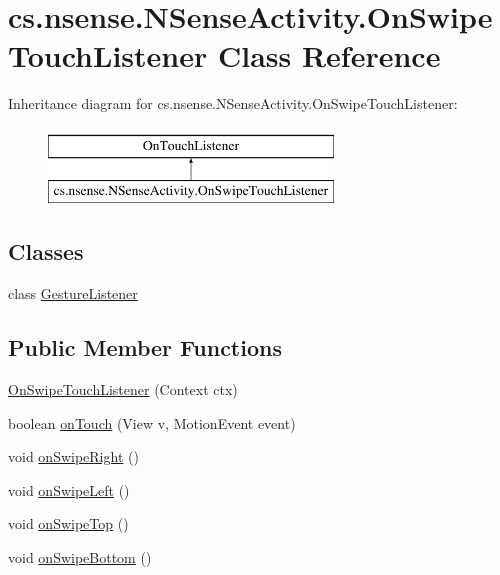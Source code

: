 \hypertarget{classcs_1_1nsense_1_1_n_sense_activity_1_1_on_swipe_touch_listener}{\section{cs.\-nsense.\-N\-Sense\-Activity.\-On\-Swipe\-Touch\-Listener Class Reference}
\label{classcs_1_1nsense_1_1_n_sense_activity_1_1_on_swipe_touch_listener}
}
Inheritance diagram for cs.\-nsense.\-N\-Sense\-Activity.\-On\-Swipe\-Touch\-Listener\-:\begin{figure}[H]
\begin{center}
\leavevmode
\includegraphics[height=2.000000cm]{classcs_1_1nsense_1_1_n_sense_activity_1_1_on_swipe_touch_listener}
\end{center}
\end{figure}
\subsection*{Classes}
\begin{DoxyCompactItemize}
\item 
class \hyperlink{classcs_1_1nsense_1_1_n_sense_activity_1_1_on_swipe_touch_listener_1_1_gesture_listener}{Gesture\-Listener}
\end{DoxyCompactItemize}
\subsection*{Public Member Functions}
\begin{DoxyCompactItemize}
\item 
\hyperlink{classcs_1_1nsense_1_1_n_sense_activity_1_1_on_swipe_touch_listener_a0e8f21a63ec5f34f113507580aed86ff}{On\-Swipe\-Touch\-Listener} (Context ctx)
\item 
boolean \hyperlink{classcs_1_1nsense_1_1_n_sense_activity_1_1_on_swipe_touch_listener_add41579d4db6c81367d98c7c94adace4}{on\-Touch} (View v, Motion\-Event event)
\item 
void \hyperlink{classcs_1_1nsense_1_1_n_sense_activity_1_1_on_swipe_touch_listener_a52cae7d8a67ee8b24d11408b3c6f3979}{on\-Swipe\-Right} ()
\item 
void \hyperlink{classcs_1_1nsense_1_1_n_sense_activity_1_1_on_swipe_touch_listener_a603236714ab720ffa6c60d58e920082c}{on\-Swipe\-Left} ()
\item 
void \hyperlink{classcs_1_1nsense_1_1_n_sense_activity_1_1_on_swipe_touch_listener_ae2e846dcaf18f2866ee8a649836d7527}{on\-Swipe\-Top} ()
\item 
void \hyperlink{classcs_1_1nsense_1_1_n_sense_activity_1_1_on_swipe_touch_listener_a099aef0fa5f9a5f293d1c971e37eb7da}{on\-Swipe\-Bottom} ()
\end{DoxyCompactItemize}
